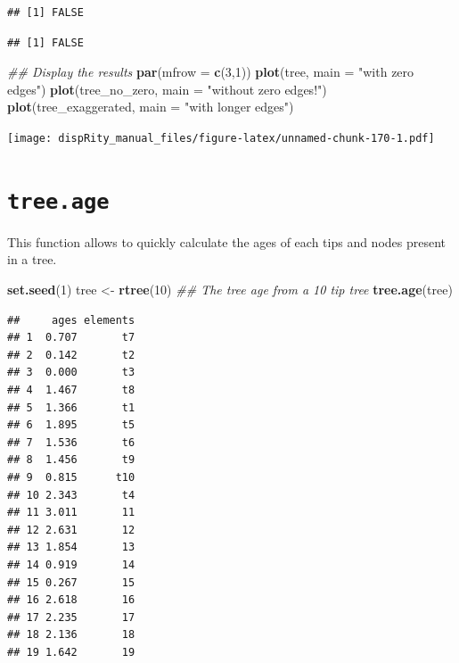 \documentclass[
]{book}
\newenvironment{Shaded}{\begin{snugshade}}{\end{snugshade}}
\newcommand{\CommentTok}[1]{\textcolor[rgb]{0.56,0.35,0.01}{\textit{#1}}}
\newcommand{\DataTypeTok}[1]{\textcolor[rgb]{0.13,0.29,0.53}{#1}}
\newcommand{\DecValTok}[1]{\textcolor[rgb]{0.00,0.00,0.81}{#1}}
\newcommand{\KeywordTok}[1]{\textcolor[rgb]{0.13,0.29,0.53}{\textbf{#1}}}
\newcommand{\NormalTok}[1]{#1}
\newcommand{\OperatorTok}[1]{\textcolor[rgb]{0.81,0.36,0.00}{\textbf{#1}}}
\newcommand{\StringTok}[1]{\textcolor[rgb]{0.31,0.60,0.02}{#1}}
\begin{document}
\begin{verbatim}
## [1] FALSE
\end{verbatim}

\begin{Shaded}
\end{Shaded}

\begin{verbatim}
## [1] FALSE
\end{verbatim}

\begin{Shaded}
\begin{Highlighting}[]
\CommentTok{\#\# Display the results}
\KeywordTok{par}\NormalTok{(}\DataTypeTok{mfrow =} \KeywordTok{c}\NormalTok{(}\DecValTok{3}\NormalTok{,}\DecValTok{1}\NormalTok{))}
\KeywordTok{plot}\NormalTok{(tree, }\DataTypeTok{main =} \StringTok{"with zero edges"}\NormalTok{)}
\KeywordTok{plot}\NormalTok{(tree\_no\_zero, }\DataTypeTok{main =} \StringTok{"without zero edges!"}\NormalTok{)}
\KeywordTok{plot}\NormalTok{(tree\_exaggerated, }\DataTypeTok{main =} \StringTok{"with longer edges"}\NormalTok{)}
\end{Highlighting}
\end{Shaded}

\texttt{[image: dispRity\_manual\_files/figure-latex/unnamed-chunk-170-1.pdf]}

\hypertarget{tree.age}{%
\section{\texorpdfstring{\texttt{tree.age}}{tree.age}}\label{tree.age}}

This function allows to quickly calculate the ages of each tips and nodes present in a tree.

\begin{Shaded}
\begin{Highlighting}[]
\KeywordTok{set.seed}\NormalTok{(}\DecValTok{1}\NormalTok{)}
\NormalTok{tree \textless{}{-}}\StringTok{ }\KeywordTok{rtree}\NormalTok{(}\DecValTok{10}\NormalTok{)}
\CommentTok{\#\# The tree age from a 10 tip tree}
\KeywordTok{tree.age}\NormalTok{(tree)}
\end{Highlighting}
\end{Shaded}

\begin{verbatim}
##     ages elements
## 1  0.707       t7
## 2  0.142       t2
## 3  0.000       t3
## 4  1.467       t8
## 5  1.366       t1
## 6  1.895       t5
## 7  1.536       t6
## 8  1.456       t9
## 9  0.815      t10
## 10 2.343       t4
## 11 3.011       11
## 12 2.631       12
## 13 1.854       13
## 14 0.919       14
## 15 0.267       15
## 16 2.618       16
## 17 2.235       17
## 18 2.136       18
## 19 1.642       19
\end{verbatim}
\end{document}

